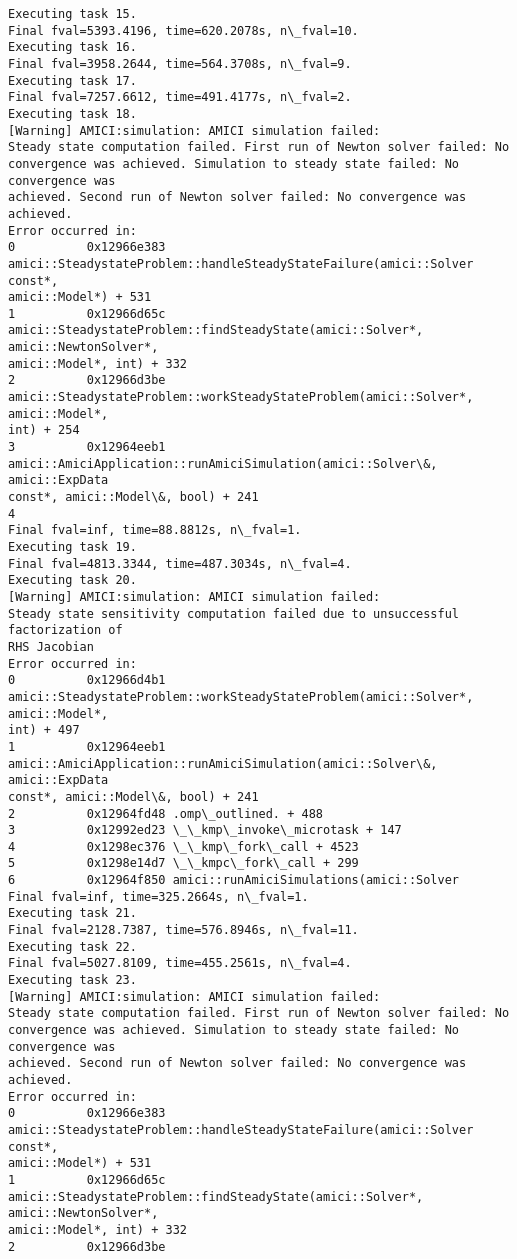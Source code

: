 \documentclass[11pt]{article}
\begin{document}
\begin{Verbatim}[commandchars=\\\{\}]
Executing task 15.
Final fval=5393.4196, time=620.2078s, n\_fval=10.
Executing task 16.
Final fval=3958.2644, time=564.3708s, n\_fval=9.
Executing task 17.
Final fval=7257.6612, time=491.4177s, n\_fval=2.
Executing task 18.
[Warning] AMICI:simulation: AMICI simulation failed:
Steady state computation failed. First run of Newton solver failed: No
convergence was achieved. Simulation to steady state failed: No convergence was
achieved. Second run of Newton solver failed: No convergence was achieved.
Error occurred in:
0          0x12966e383
amici::SteadystateProblem::handleSteadyStateFailure(amici::Solver const*,
amici::Model*) + 531
1          0x12966d65c
amici::SteadystateProblem::findSteadyState(amici::Solver*, amici::NewtonSolver*,
amici::Model*, int) + 332
2          0x12966d3be
amici::SteadystateProblem::workSteadyStateProblem(amici::Solver*, amici::Model*,
int) + 254
3          0x12964eeb1
amici::AmiciApplication::runAmiciSimulation(amici::Solver\&, amici::ExpData
const*, amici::Model\&, bool) + 241
4
Final fval=inf, time=88.8812s, n\_fval=1.
Executing task 19.
Final fval=4813.3344, time=487.3034s, n\_fval=4.
Executing task 20.
[Warning] AMICI:simulation: AMICI simulation failed:
Steady state sensitivity computation failed due to unsuccessful factorization of
RHS Jacobian
Error occurred in:
0          0x12966d4b1
amici::SteadystateProblem::workSteadyStateProblem(amici::Solver*, amici::Model*,
int) + 497
1          0x12964eeb1
amici::AmiciApplication::runAmiciSimulation(amici::Solver\&, amici::ExpData
const*, amici::Model\&, bool) + 241
2          0x12964fd48 .omp\_outlined. + 488
3          0x12992ed23 \_\_kmp\_invoke\_microtask + 147
4          0x1298ec376 \_\_kmp\_fork\_call + 4523
5          0x1298e14d7 \_\_kmpc\_fork\_call + 299
6          0x12964f850 amici::runAmiciSimulations(amici::Solver
Final fval=inf, time=325.2664s, n\_fval=1.
Executing task 21.
Final fval=2128.7387, time=576.8946s, n\_fval=11.
Executing task 22.
Final fval=5027.8109, time=455.2561s, n\_fval=4.
Executing task 23.
[Warning] AMICI:simulation: AMICI simulation failed:
Steady state computation failed. First run of Newton solver failed: No
convergence was achieved. Simulation to steady state failed: No convergence was
achieved. Second run of Newton solver failed: No convergence was achieved.
Error occurred in:
0          0x12966e383
amici::SteadystateProblem::handleSteadyStateFailure(amici::Solver const*,
amici::Model*) + 531
1          0x12966d65c
amici::SteadystateProblem::findSteadyState(amici::Solver*, amici::NewtonSolver*,
amici::Model*, int) + 332
2          0x12966d3be

\end{Verbatim}
\end{document}
